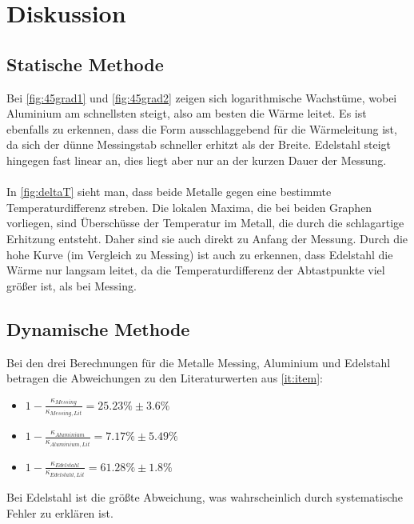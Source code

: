\section{Diskussion}
\label{sec:Diskussion}

\subsection{Statische Methode}
Bei \autoref{fig:45grad1} und \autoref{fig:45grad2} zeigen sich logarithmische Wachstüme, wobei Aluminium am schnellsten steigt, also am besten die Wärme leitet.
Es ist ebenfalls zu erkennen, dass die Form ausschlaggebend für die Wärmeleitung ist, da sich der dünne Messingstab schneller erhitzt als der Breite.
Edelstahl steigt hingegen fast linear an, dies liegt aber nur an der kurzen Dauer der Messung.
\\
\
\\
In \autoref{fig:deltaT} sieht man, dass beide Metalle gegen eine bestimmte Temperaturdifferenz streben.
Die lokalen Maxima, die bei beiden Graphen vorliegen, sind Überschüsse der Temperatur im Metall, die durch die schlagartige Erhitzung entsteht.
Daher sind sie auch direkt zu Anfang der Messung.
Durch die hohe Kurve (im Vergleich zu Messing) ist auch zu erkennen, dass Edelstahl die Wärme nur langsam leitet, da die Temperaturdifferenz der Abtastpunkte viel größer ist, als bei Messing.
\subsection{Dynamische Methode}
Bei den drei Berechnungen für die Metalle Messing, Aluminium und Edelstahl betragen die Abweichungen zu den Literaturwerten aus \autoref{it:item}:
\begin{itemize}
    \item[] $1- \frac{\kappa_{Messing}}{\kappa_{Messing,Lit}} = 25.23\% \pm 3.6\%$
    \item[] $1- \frac{\kappa_{Aluminium}}{\kappa_{Aluminium,Lit}} = 7.17\% \pm 5.49\%$ 
    \item[] $1- \frac{\kappa_{Edelstahl}}{\kappa_{Edelstahl,Lit}} = 61.28\% \pm 1.8\%$ 
\end{itemize}
Bei Edelstahl ist die größte Abweichung, was wahrscheinlich durch systematische Fehler zu erklären ist.
